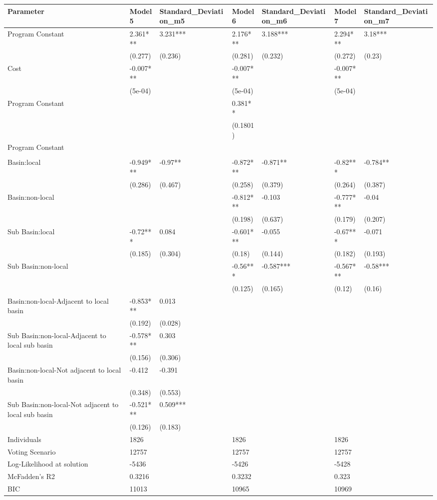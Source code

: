 \begin{table}[ht]
\centering
\begin{tabular}{lllllll}
  \hline
Parameter & Model 5 & Standard\_Deviation\_m5 & Model 6 & Standard\_Deviation\_m6 & Model 7 & Standard\_Deviation\_m7 \\ 
  \hline
Program Constant & 2.361*** & 3.231*** & 2.176*** & 3.188*** & 2.294*** & 3.18*** \\ 
   & (0.277) & (0.236) & (0.281) & (0.232) & (0.272) & (0.23) \\ 
  Cost & -0.007*** &  & -0.007*** &  & -0.007*** &  \\ 
   & (5e-04) &  & (5e-04) &  & (5e-04) &  \\ 
  Program Constant &  &  & 0.381** &  &  &  \\ 
   &  &  & (0.1801) &  &  &  \\ 
  Program Constant &  &  &  &  &  &  \\ 
   &  &  &  &  &  &  \\ 
  Basin:local & -0.949*** & -0.97** & -0.872*** & -0.871** & -0.82*** & -0.784** \\ 
   & (0.286) & (0.467) & (0.258) & (0.379) & (0.264) & (0.387) \\ 
  Basin:non-local &  &  & -0.812*** & -0.103 & -0.777*** & -0.04 \\ 
   &  &  & (0.198) & (0.637) & (0.179) & (0.207) \\ 
  Sub Basin:local & -0.72*** & 0.084 & -0.601*** & -0.055 & -0.67*** & -0.071 \\ 
   & (0.185) & (0.304) & (0.18) & (0.144) & (0.182) & (0.193) \\ 
  Sub Basin:non-local &  &  & -0.56*** & -0.587*** & -0.567*** & -0.58*** \\ 
   &  &  & (0.125) & (0.165) & (0.12) & (0.16) \\ 
  Basin:non-local-Adjacent to local basin & -0.853*** & 0.013 &  &  &  &  \\ 
   & (0.192) & (0.028) &  &  &  &  \\ 
  Sub Basin:non-local-Adjacent to local sub basin & -0.578*** & 0.303 &  &  &  &  \\ 
   & (0.156) & (0.306) &  &  &  &  \\ 
  Basin:non-local-Not adjacent to local basin & -0.412 & -0.391 &  &  &  &  \\ 
   & (0.348) & (0.553) &  &  &  &  \\ 
  Sub Basin:non-local-Not adjacent to local sub basin & -0.521*** & 0.509*** &  &  &  &  \\ 
   & (0.126) & (0.183) &  &  &  &  \\ 
  Individuals & 1826 &  & 1826 &  & 1826 &  \\ 
  Voting Scenario & 12757 &  & 12757 &  & 12757 &  \\ 
  Log-Likelihood at solution & -5436 &  & -5426 &  & -5428 &  \\ 
  McFadden’s R2 & 0.3216 &  & 0.3232 &  & 0.323 &  \\ 
  BIC & 11013 &  & 10965 &  & 10969 &  \\ 
   \hline
\end{tabular}
\end{table}
